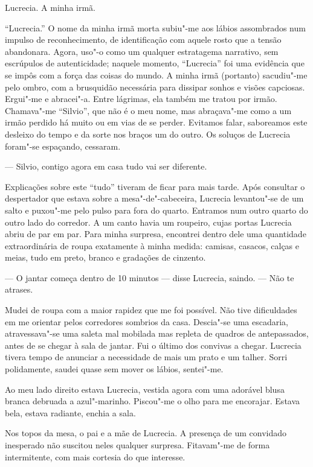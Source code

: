 Lucrecia. A minha irmã.

``Lucrecia.'' O nome da minha irmã morta subiu"-me aos lábios assombrados
num impulso de reconhecimento, de identificação com aquele rosto que a
tensão abandonara. Agora, uso"-o como um qualquer estratagema narrativo,
sem escrúpulos de autenticidade; naquele momento, ``Lucrecia'' foi uma
evidência que se impôs com a força das coisas do mundo. A minha irmã
(portanto) sacudiu"-me pelo ombro, com a brusquidão necessária para
dissipar sonhos e visões capciosas. Ergui"-me e abracei"-a. Entre
lágrimas, ela também me tratou por irmão. Chamava"-me ``Silvio'', que não
é o meu nome, mas abraçava"-me como a um irmão perdido há muito ou em
vias de se perder. Evitamos falar, saboreamos este desleixo do tempo e
da sorte nos braços um do outro. Os soluços de Lucrecia foram"-se
espaçando, cessaram.

--- Silvio, contigo agora em casa tudo vai ser diferente.

Explicações sobre este ``tudo'' tiveram de ficar para mais tarde. Após
consultar o despertador que estava sobre a mesa"-de"-cabeceira, Lucrecia levantou"-se de um salto e puxou"-me pelo pulso
para fora do quarto. Entramos num outro quarto do outro lado do
corredor. A um canto havia um roupeiro, cujas portas Lucrecia abriu de
par em par. Para minha surpresa, encontrei dentro dele uma quantidade
extraordinária
de roupa exatamente à minha medida: camisas, casacos, calças e meias,
tudo em preto, branco e gradações de cinzento.

--- O jantar começa dentro de 10 minutos --- disse Lucrecia, saindo.
--- Não te atrases.

Mudei de roupa com a maior rapidez que me foi possível. Não tive
dificuldades em me orientar pelos corredores sombrios da casa.
Descia"-se uma escadaria, atravessava"-se uma saleta mal mobilada mas
repleta de quadros de antepassados, antes de se chegar à sala de jantar.
Fui o último dos convivas a chegar. Lucrecia tivera tempo de anunciar a
necessidade de mais um prato e um talher. Sorri polidamente, saudei
quase sem mover os lábios, sentei"-me.

Ao meu lado direito estava Lucrecia, vestida agora com uma adorável
blusa branca debruada a azul"-marinho. Piscou"-me o olho para me encorajar. Estava bela, estava radiante, enchia a
sala.

Nos topos da mesa, o pai e a mãe de Lucrecia. A presença de um convidado
inesperado não suscitou neles qualquer surpresa. Fitavam"-me de forma
intermitente, com mais cortesia do que interesse.

